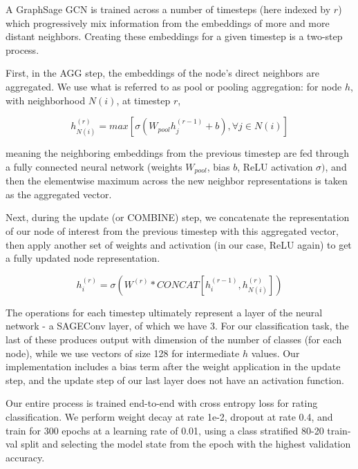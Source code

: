 \documentclass{article}[11pt]
\begin{document}
    \label{sec:gnn-architecture}


    A GraphSage GCN is trained across a number of timesteps (here indexed by $r$) which progressively mix information from the embeddings of more and more distant neighbors. Creating these embeddings for a given timestep is a two-step process.

    First, in the AGG step, the embeddings of the node's direct neighbors are aggregated. We use what is referred to as pool or pooling aggregation: for node $h$, with neighborhood $N(i)$, at timestep $r$,

    \[
    h_{N(i)}^{(r)}=max[\sigma(W_{pool}h_{j}^{(r-1)}+b),\forall j\in N(i)]
    \]

    meaning the neighboring embeddings from the previous timestep are fed through a fully connected neural network (weights $W_{pool}$, bias $b$, ReLU activation $\sigma)$, and then the elementwise maximum across the new neighbor representations is taken as the aggregated vector.

    Next, during the update (or COMBINE) step, we concatenate the representation of our node of interest from the previous timestep with this aggregated vector, then apply another set of weights and activation (in our case, ReLU again) to get a fully updated node representation.

    \[
    h_{i}^{(r)}=\sigma(W^{(r)}*CONCAT[h_{i}^{(r-1)},h_{N(i)}^{(r)}])
    \]

    The operations for each timestep ultimately represent a layer of the neural network - a SAGEConv layer, of which we have 3. For our classification task, the last of these produces output with dimension of the number of classes (for each node), while we use vectors of size 128 for intermediate $h$ values. Our implementation includes a bias term after the weight application in the update step, and the update step of our last layer does not have an activation function.
    
    Our entire process is trained end-to-end with cross entropy loss for rating classification. We perform weight decay at rate 1e-2, dropout at rate 0.4, and train for 300 epochs at a learning rate of 0.01, using a class stratified 80-20 train-val split and selecting the model state from the epoch with the highest validation accuracy.

\end{document}
